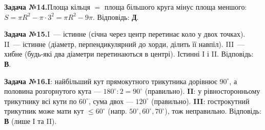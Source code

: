 \documentclass[12pt]{article}
\begin{document}
\par\vspace{0.3cm}\noindent\hypertarget{sol:14}{}
\begin{tcolorbox}[colback=titleBg!40, colframe=mainGreen!55, boxrule=0.4pt, arc=2pt, left=6pt, right=6pt, top=4pt, bottom=4pt, breakable]
\noindent\small\textbf{Задача №14.}\quad Площа кільця $=$ площа більшого круга мінус площа меншого: $S=\pi R^2-\pi\cdot3^2=\pi R^2-9\pi$. Відповідь: \textbf{Д}.
\par\vspace{0.1cm}\hfill\hyperlink{task:14}{}
\end{tcolorbox}
\par\vspace{0.3cm}\noindent\hypertarget{sol:15}{}
\begin{tcolorbox}[colback=titleBg!40, colframe=mainGreen!55, boxrule=0.4pt, arc=2pt, left=6pt, right=6pt, top=4pt, bottom=4pt, breakable]
\noindent\small\textbf{Задача №15.}\quad I~--- істинне (січна через центр перетинає коло у двох точках). II~--- істинне (діаметр, перпендикулярний до хорди, ділить її навпіл). III~--- хибне (будь-які два діаметри перетинаються в центрі). Істинні I і II. Відповідь: \textbf{В}.
\par\vspace{0.1cm}\hfill\hyperlink{task:15}{}
\end{tcolorbox}
\par\vspace{0.3cm}\noindent\hypertarget{sol:16}{}
\begin{tcolorbox}[colback=titleBg!40, colframe=mainGreen!55, boxrule=0.4pt, arc=2pt, left=6pt, right=6pt, top=4pt, bottom=4pt, breakable]
\noindent\small\textbf{Задача №16.}\quad \textbf{I}: найбільший кут прямокутного трикутника дорівнює $90^\circ$, а половина розгорнутого кута — $180^\circ:2=90^\circ$ (правильно). \textbf{II}: у рівносторонньому трикутнику всі кути по $60^\circ$, сума двох — $120^\circ$ (правильно). \textbf{III}: гострокутний трикутник може мати кут $\le60^\circ$ (напр. $50^\circ,60^\circ,70^\circ$), тож неправильно. Відповідь: \textbf{В} (лише I та II).
\par\vspace{0.1cm}\hfill\hyperlink{task:16}{}
\end{tcolorbox}
\par\vspace{0.3cm}\noindent\hypertarget{sol:17}{}
\end{document}
